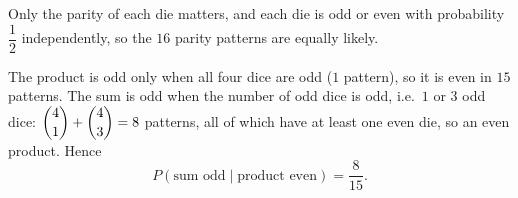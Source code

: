 Only the parity of each die matters, and each die is odd or even with probability $\dfrac{1}{2}$ independently, so the $16$ parity patterns are equally likely.

The product is odd only when all four dice are odd ($1$ pattern), so it is even in $15$ patterns. The sum is odd when the number of odd dice is odd, i.e.\ $1$ or $3$ odd dice: $\dbinom41+\dbinom43=8$ patterns, all of which have at least one even die, so an even product. Hence
\[
P(\text{sum odd}\mid\text{product even})=\boxed{\dfrac{8}{15}}.
\]
